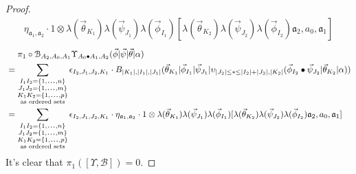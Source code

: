 \begin{proof}
\begin{equation*}
\begin{aligned}
\eta_{\mathfrak{a}_1, \mathfrak{a}_2} \cdot
1 \otimes \lambda(\vec{\theta}_{K_1}) \lambda(\vec{\psi}_{J_1}) 
  \lambda(\vec{\phi}_{I_1})[
     \lambda(\vec{\theta}_{K_2}) \lambda(\vec{\psi}_{J_2}) 
     \lambda(\vec{\phi}_{I_2})
     \mathfrak{a}_2, a_0, \mathfrak{a}_1]    
\end{aligned}
\end{equation*}
%
\begin{align*}
& \phantom{{}={}}
\pi_1 \circ \mathcal{B}_{A_2, A_0, A_1} 
  \Upsilon_{A_0 \bullet A_1, A_2} 
  (\vec{\phi} | \vec{\psi} | \vec{\theta} | \alpha ) \\
&= 
\sum \limits_{\substack{
  I_1I_2 = \{1,\smdots,n\}\\
  J_1J_2 = \{1,\smdots,m\}\\
  K_1K_2 = \{1,\smdots,p\}\\
  \textrm{as ordered sets}}}
\epsilon_{I_2,J_1,J_2,K_1}\cdot
B_{|K_1|, |I_1|, |J_1|} 
   (\vec{\theta}_{K_1} | \vec{\phi}_{I_1} | \vec{\psi}_{J_1} | 
   \upsilon_{|J_2| \leq * \leq |I_2|+|J_2|, |K_2|} 
   (\vec{\phi}_{I_2} \bullet \vec{\psi}_{J_2} | \vec{\theta}_{K_2} | \alpha)) \\
&= 
\sum \limits_{\substack{
  I_1I_2 = \{1,\smdots,n\}\\
  J_1J_2 = \{1,\smdots,m\}\\
  K_1K_2 = \{1,\smdots,p\}\\
  \textrm{as ordered sets}}}
\epsilon_{I_2,J_1,J_2,K_1}\cdot
\eta_{\mathfrak{a}_1, \mathfrak{a}_2} \cdot
1 \otimes \lambda(\vec{\theta}_{K_1}) \lambda(\vec{\psi}_{J_1}) 
  \lambda(\vec{\phi}_{I_1})[
     \lambda(\vec{\theta}_{K_2}) \lambda(\vec{\psi}_{J_2}) 
     \lambda(\vec{\phi}_{I_2})
     \mathfrak{a}_2, a_0, \mathfrak{a}_1]  
\end{align*}
It's clear that $\pi_1([\Upsilon, \mathcal{B}]) = 0$.
\end{proof}
